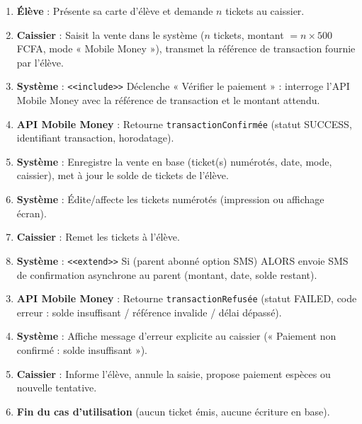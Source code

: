 \documentclass[11pt]{article}
\begin{document}
\begin{exoresolu}
\begin{exemplebox}
\begin{enumerate}
  \item \textbf{Élève} : Présente sa carte d'élève et demande $n$ tickets au caissier.
  \item \textbf{Caissier} : Saisit la vente dans le système ($n$ tickets, montant $= n \times 500$ FCFA, mode « Mobile Money »), transmet la référence de transaction fournie par l'élève.
  \item \textbf{Système} : \texttt{<<include>>} Déclenche « Vérifier le paiement » : interroge l'API Mobile Money avec la référence de transaction et le montant attendu.
  \item \textbf{API Mobile Money} : Retourne \texttt{transactionConfirmée} (statut SUCCESS, identifiant transaction, horodatage).
  \item \textbf{Système} : Enregistre la vente en base (ticket(s) numérotés, date, mode, caissier), met à jour le solde de tickets de l'élève.
  \item \textbf{Système} : Édite/affecte les tickets numérotés (impression ou affichage écran).
  \item \textbf{Caissier} : Remet les tickets à l'élève.
  \item \textbf{Système} : \texttt{<<extend>>} Si (parent abonné option SMS) ALORS envoie SMS de confirmation asynchrone au parent (montant, date, solde restant).
\end{enumerate}
\end{exemplebox}

\begin{exemplebox}
\begin{enumerate}
  \setcounter{enumi}{2}
  \item \textbf{API Mobile Money} : Retourne \texttt{transactionRefusée} (statut FAILED, code erreur : solde insuffisant / référence invalide / délai dépassé).
  \item \textbf{Système} : Affiche message d'erreur explicite au caissier (« Paiement non confirmé : solde insuffisant »).
  \item \textbf{Caissier} : Informe l'élève, annule la saisie, propose paiement espèces ou nouvelle tentative.
  \item \textbf{Fin du cas d'utilisation} (aucun ticket émis, aucune écriture en base).
\end{enumerate}
\end{exemplebox}


\end{exoresolu}
\end{document}
